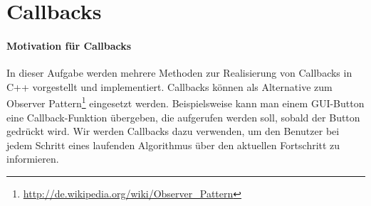\section{Callbacks}

\paragraph*{Motivation für Callbacks}
In dieser Aufgabe werden mehrere Methoden zur Realisierung von Callbacks in C++ vorgestellt und implementiert. 
Callbacks können als Alternative zum Observer Pattern\footnote{\url{http://de.wikipedia.org/wiki/Observer_Pattern}} eingesetzt werden.
Beispielsweise kann man einem GUI-Button eine Callback-Funktion übergeben, die aufgerufen werden soll, sobald der Button gedrückt wird.
Wir werden Callbacks dazu verwenden, um den Benutzer bei jedem Schritt eines laufenden Algorithmus über den aktuellen Fortschritt zu informieren.

